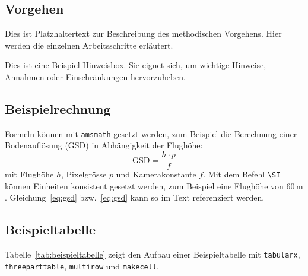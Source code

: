 \subsection{Vorgehen}
\label{subsec:vorgehen}
Dies ist Platzhaltertext zur Beschreibung des methodischen Vorgehens. Hier werden die
einzelnen Arbeitsschritte erläutert.

\begin{tcolorbox}[myboxstyle, title=Hinweis]
Dies ist eine Beispiel-Hinweisbox. Sie eignet sich, um wichtige
Hinweise, Annahmen oder Einschränkungen hervorzuheben.
\end{tcolorbox}

\subsection{Beispielrechnung}
\label{subsec:beispielrechnung}
Formeln können mit \texttt{amsmath} gesetzt werden, zum Beispiel die Berechnung einer
Bodenauflösung (GSD) in Abhängigkeit der Flughöhe:
\begin{equation}
    \text{GSD} = \frac{h \cdot p}{f}
    \label{eq:gsd}
\end{equation}
mit Flughöhe $h$, Pixelgrösse $p$ und Kamerakonstante $f$. Mit dem Befehl \texttt{\textbackslash SI}
können Einheiten konsistent gesetzt werden, zum Beispiel eine Flughöhe von $60\,\mathrm{m}$.
Gleichung~\ref{eq:gsd} bzw.\ \cref{eq:gsd} kann so im Text referenziert werden.

\subsection{Beispieltabelle}
\label{subsec:beispieltabelle}
Tabelle~\ref{tab:beispieltabelle} zeigt den Aufbau einer Beispieltabelle mit
\texttt{tabularx}, \texttt{threeparttable}, \texttt{multirow} und \texttt{makecell}.


